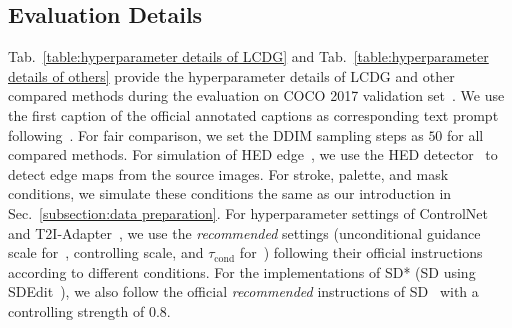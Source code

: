 \documentclass{article}
\begin{document}
\begin{table}[t]
  \centering
  \small
  \caption{Hyperparameter details of other compared methods for the evaluation upon COCO 2017 validation set~\cite{lin2014microsoft}. We try to ensure all compared methods using the same diffusion backbone (SD v$1.4$) for fair comparison. Note that ControlNet~\cite{zhang2023adding} only implements their methods based upon SD~\cite{rombach2022high} with version of $1.5$.}
  \setlength{\tabcolsep}{0.65mm}
  \label{table:hyperparameter details of others}
\end{table}

\subsection{Evaluation Details}
Tab.~\ref{table:hyperparameter details of LCDG} and Tab.~\ref{table:hyperparameter details of others} provide the hyperparameter details of LCDG and other compared methods during the evaluation on COCO 2017 validation set~\cite{lin2014microsoft}. We use the first caption of the official annotated captions as corresponding text prompt following~\cite{mou2023t2i}. For fair comparison, we set the DDIM sampling steps as $50$ for all compared methods. For simulation of HED edge~\cite{xie2015holistically}, we use the HED detector~\cite{xie2015holistically} to detect edge maps from the source images. For stroke, palette, and mask conditions, we simulate these conditions the same as our introduction in Sec.~\ref{subsection:data preparation}. For hyperparameter settings of ControlNet~\cite{zhang2023adding} and T2I-Adapter~\cite{mou2023t2i}, we use the \textit{recommended} settings (unconditional guidance scale for~\cite{ho2022classifier}, controlling scale, and $\tau_{\text{cond}}$ for~\cite{mou2023t2i}) following their official instructions according to different conditions. For the implementations of SD* (SD using SDEdit~\cite{meng2021sdedit}), we also follow the official 
\textit{recommended} instructions of SD~\cite{rombach2022high} with a controlling strength of $0.8$.
\end{document}
